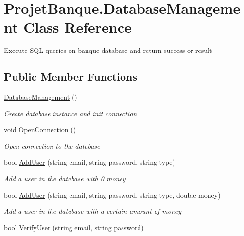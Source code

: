 \hypertarget{class_projet_banque_1_1_database_management}{}\section{Projet\+Banque.\+Database\+Management Class Reference}
\label{class_projet_banque_1_1_database_management}


Execute S\+QL queries on banque database and return success or result  


\subsection*{Public Member Functions}
\begin{DoxyCompactItemize}
\item 
\mbox{\hyperlink{class_projet_banque_1_1_database_management_a595d794798b5b753d9d43c623a679abc}{Database\+Management}} ()
\begin{DoxyCompactList}\small\item\em Create database instance and init connection \end{DoxyCompactList}\item 
void \mbox{\hyperlink{class_projet_banque_1_1_database_management_ae0af13394741c4671c86ffb098e281e7}{Open\+Connection}} ()
\begin{DoxyCompactList}\small\item\em Open connection to the database \end{DoxyCompactList}\item 
bool \mbox{\hyperlink{class_projet_banque_1_1_database_management_acf89f88775d4c333e5b17f76a4913530}{Add\+User}} (string email, string password, string type)
\begin{DoxyCompactList}\small\item\em Add a user in the database with 0 money \end{DoxyCompactList}\item 
bool \mbox{\hyperlink{class_projet_banque_1_1_database_management_a8897afb1154de9e27b3823465a9af0eb}{Add\+User}} (string email, string password, string type, double money)
\begin{DoxyCompactList}\small\item\em Add a user in the database with a certain amount of money \end{DoxyCompactList}\item 
bool \mbox{\hyperlink{class_projet_banque_1_1_database_management_a2b1815dc73339c7abbe63e2b8403143d}{Verify\+User}} (string email, string password)

\end{DoxyCompactItemize}
